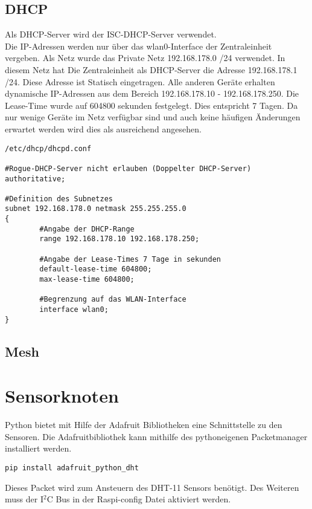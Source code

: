 \subsection{DHCP}

Als DHCP-Server wird der ISC-DHCP-Server verwendet.\\
Die IP-Adressen werden nur über das wlan0-Interface der Zentraleinheit vergeben.
Als Netz wurde das Private Netz 192.168.178.0 /24 verwendet. In diesem Netz hat
Die Zentraleinheit als DHCP-Server die Adresse 192.168.178.1 /24. Diese Adresse
ist Statisch eingetragen. Alle anderen Geräte erhalten dynamische IP-Adressen
aus dem Bereich 192.168.178.10 - 192.168.178.250. Die Lease-Time wurde auf
604800 sekunden festgelegt. Dies entspricht 7 Tagen. Da nur wenige Geräte im
Netz verfügbar sind und auch keine häufigen Änderungen erwartet werden wird dies
als ausreichend angesehen.

\begin{verbatim}
/etc/dhcp/dhcpd.conf

#Rogue-DHCP-Server nicht erlauben (Doppelter DHCP-Server)
authoritative;

#Definition des Subnetzes
subnet 192.168.178.0 netmask 255.255.255.0
{
        #Angabe der DHCP-Range
        range 192.168.178.10 192.168.178.250;

        #Angabe der Lease-Times 7 Tage in sekunden
        default-lease-time 604800;
        max-lease-time 604800;

        #Begrenzung auf das WLAN-Interface
        interface wlan0;
}

\end{verbatim}

\subsection{Mesh}
\section{Sensorknoten} %
Python bietet mit Hilfe der Adafruit\cite{Adafruit60:online} Bibliotheken eine Schnittstelle zu den Sensoren. Die Adafruitbibliothek kann mithilfe des pythoneigenen Packetmanager installiert werden.
\begin{verbatim}
pip install adafruit_python_dht
\end{verbatim}
Dieses Packet wird zum Ansteuern des DHT-11 Sensors benötigt. Des Weiteren muss der I$^2$C Bus in der Raspi-config Datei aktiviert werden.
